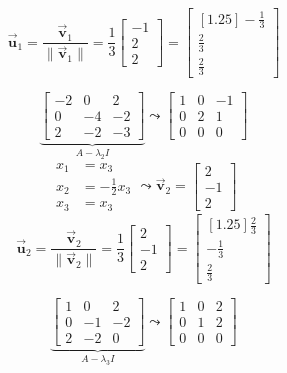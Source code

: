 \documentclass[letter,11pt]{article}
\theoremstyle{definition}
\begin{document}
\begin{tcolorbox}[boxrule=1mm, width=(\linewidth),before=\hfill,after=\hfill,adjusted title={Problem 3 Solutions}]
\begin{minipage}{0.333\textwidth}
        $$\vec{\boldsymbol{u}}_{1} = \frac{\vec{\boldsymbol{v}}_{1}}{\|\vec{\boldsymbol{v}}_{1}\|} =\frac{1}{3}\begin{bmatrix}-1\\2\\2\end{bmatrix}=  \begin{bmatrix}[1.25] -\frac{1}{3}\\ \frac{2}{3} \\ \frac{2}{3}\end{bmatrix}$$
         \end{minipage}%
         \begin{minipage}{0.333\textwidth}
            $$\underbrace{\begin{bmatrix} -2 & 0 & 2 \\ 0 & -4 & -2 \\ 2 & -2 & -3 \end{bmatrix}}_{A-\lambda_{2}I}\leadsto \begin{bmatrix} 1 & 0 & -1 \\ 0 & 2 & 1 \\ 0 & 0 & 0\end{bmatrix}$$
            $$\begin{aligned}
                 x_{1} &= x_{3}\\
                    x_{2} &= -\frac{1}{2}x_{3}\\
                    x_{3}&=x_{3}
        \end{aligned} \leadsto \vec{\boldsymbol{v}}_2 = \begin{bmatrix}2\\-1\\2\end{bmatrix}$$
        $$\vec{\boldsymbol{u}}_{2} = \frac{\vec{\boldsymbol{v}}_{2}}{\|\vec{\boldsymbol{v}}_{2}\|} =\frac{1}{3}\begin{bmatrix}2\\-1\\2\end{bmatrix}= \begin{bmatrix}[1.25] \frac{2}{3}\\ -\frac{1}{3} \\ \frac{2}{3}\end{bmatrix}$$
         \end{minipage}%
         \begin{minipage}{0.333\textwidth}
            $$\underbrace{\begin{bmatrix} 1 & 0 & 2 \\ 0 & -1 & -2 \\ 2 & -2 & 0 \end{bmatrix}}_{A-\lambda_{3}I}\leadsto \begin{bmatrix} 1 & 0 & 2 \\ 0 & 1 & 2 \\ 0 & 0 & 0\end{bmatrix}$$

\end{minipage}
\end{tcolorbox}
\end{document}
